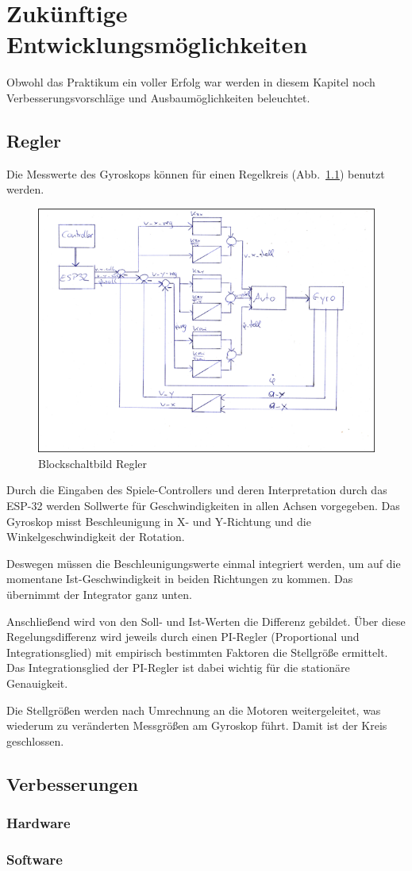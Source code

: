 \chapter{Zukünftige Entwicklungsmöglichkeiten}
Obwohl das Praktikum ein voller Erfolg war werden in diesem Kapitel noch Verbesserungsvorschläge und Ausbaumöglichkeiten beleuchtet. 

\section{Regler}
Die Messwerte des Gyroskops können für einen Regelkreis (Abb.~\ref{bild:regler}) benutzt werden. 

\begin{figure}[!ht]
	\centering
	\includegraphics[width=\textwidth]{bilder/regler.png}
	\caption{Blockschaltbild Regler}
	\label{bild:regler}
\end{figure}

Durch die Eingaben des Spiele-Controllers und deren Interpretation durch das ESP-32 werden Sollwerte für Geschwindigkeiten in allen Achsen vorgegeben. 
Das Gyroskop misst Beschleunigung in X- und Y-Richtung und die Winkelgeschwindigkeit der Rotation. 

Deswegen müssen die Beschleunigungswerte einmal integriert werden, um auf die momentane Ist-Geschwindigkeit in beiden Richtungen zu kommen. 
Das übernimmt der Integrator ganz unten. 

Anschließend wird von den Soll- und Ist-Werten die Differenz gebildet. 
Über diese Regelungsdifferenz wird jeweils durch einen PI-Regler (Proportional und Integrationsglied) mit empirisch bestimmten Faktoren die Stellgröße ermittelt. 
Das Integrationsglied der PI-Regler ist dabei wichtig für die stationäre Genauigkeit. 

Die Stellgrößen werden nach Umrechnung an die Motoren weitergeleitet, was wiederum zu veränderten Messgrößen am Gyroskop führt. 
Damit ist der Kreis geschlossen. 


\section{Verbesserungen}
\subsection{Hardware}

\subsection{Software}

